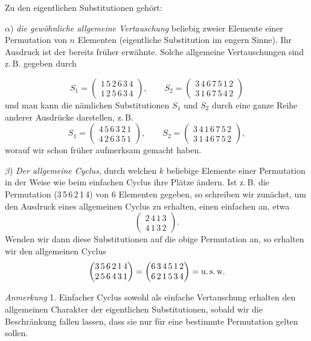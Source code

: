 \documentclass[11pt]{article}
\begin{document}
Zu den eigentlichen Substitutionen gehört:

$\alpha$) \textit{die gewöhnliche allgemeine Vertauschung} beliebig
zweier Elemente einer Permutation von $n$ Elementen (eigentliche
Substitution im engern Sinne). Ihr Ausdruck ist der bereits früher
erwähnte. Solche allgemeine Vertauschungen sind z.\,B. gegeben durch

\[
S_1=\begin{pmatrix}1\,5\,2\,6\,3\,4\\1\,2\,5\,6\,3\,4\end{pmatrix},\qquad
S_2=\begin{pmatrix}3\,4\,6\,7\,5\,1\,2\\3\,1\,6\,7\,5\,4\,2\end{pmatrix}
\]
und man kann die nämlichen Substitutionen $S_1$ und $S_2$ durch eine
ganze Reihe anderer Ausdrücke darstellen, z.\,B.
\[
S_1=\begin{pmatrix}4\,5\,6\,3\,2\,1\\4\,2\,6\,3\,5\,1\end{pmatrix},\qquad
S_2=\begin{pmatrix}3\,4\,1\,6\,7\,5\,2\\3\,1\,4\,6\,7\,5\,2\end{pmatrix},
\]
worauf wir schon früher aufmerksam gemacht haben.

$\beta$) \textit{Der allgemeine Cyclus}, durch welchen $k$ beliebige
Elemente einer Permutation in der Weise wie beim einfachen Cyclus ihre
Plätze ändern. Ist z.\,B. die Permutation (3\,5\,6\,2\,1\,4) von 6
Elementen gegeben, so schreiben wir zunächst, um den Ausdruck eines
allgemeinen Cyclus zu erhalten, einen einfachen an, etwa
\[
\begin{pmatrix}2\,4\,1\,3\\4\,1\,3\,2\end{pmatrix}.
\]
Wenden wir dann diese Substitutionen auf die obige Permutation an, so
erhalten wir den allgemeinen Cyclus
\[
\begin{pmatrix}3\,5\,6\,2\,1\,4\\2\,5\,6\,4\,3\,1\end{pmatrix}=
\begin{pmatrix}6\,3\,4\,5\,1\,2\\6\,2\,1\,5\,3\,4\end{pmatrix}=\text{u.\,s.\,w.}
\]

\textit{Anmerkung} 1. Einfacher Cyclus sowohl als einfache Vertauschung
erhalten den allgemeinen Charakter der eigentlichen Substitutionen,
sobald wir die Beschränkung fallen lassen, dass sie nur für eine
bestimmte Permutation gelten sollen.
\end{document}

